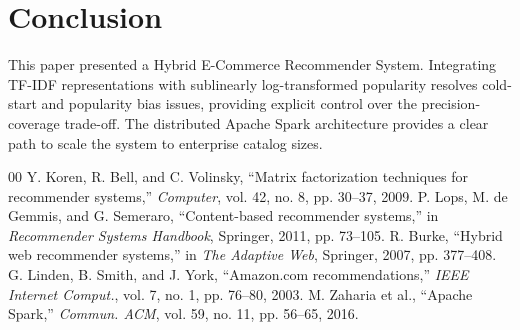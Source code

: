 \documentclass[conference]{IEEEtran}
\begin{document}
\section{Conclusion}
This paper presented a Hybrid E-Commerce Recommender System. Integrating TF-IDF representations with sublinearly log-transformed popularity resolves cold-start and popularity bias issues, providing explicit control over the precision-coverage trade-off. The distributed Apache Spark architecture provides a clear path to scale the system to enterprise catalog sizes.

\begin{thebibliography}{00}
 Y. Koren, R. Bell, and C. Volinsky, ``Matrix factorization techniques for recommender systems,'' \textit{Computer}, vol. 42, no. 8, pp. 30--37, 2009.
 P. Lops, M. de Gemmis, and G. Semeraro, ``Content-based recommender systems,'' in \textit{Recommender Systems Handbook}, Springer, 2011, pp. 73--105.
 R. Burke, ``Hybrid web recommender systems,'' in \textit{The Adaptive Web}, Springer, 2007, pp. 377--408.
 G. Linden, B. Smith, and J. York, ``Amazon.com recommendations,'' \textit{IEEE Internet Comput.}, vol. 7, no. 1, pp. 76--80, 2003.
 M. Zaharia et al., ``Apache Spark,'' \textit{Commun. ACM}, vol. 59, no. 11, pp. 56--65, 2016.
\end{thebibliography}
\end{document}
